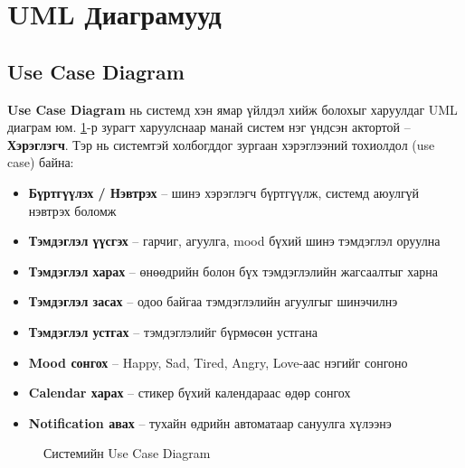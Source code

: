\section{UML Диаграмууд}

\subsection{Use Case Diagram}

\textbf{Use Case Diagram} нь системд хэн ямар үйлдэл хийж болохыг харуулдаг UML диаграм юм.
\ref{fig:usecase}-р зурагт харуулснаар манай систем нэг үндсэн актортой -- \textbf{Хэрэглэгч}.
Тэр нь системтэй холбогддог зургаан хэрэглээний тохиолдол (use case) байна:

\begin{itemize}
  \item \textbf{Бүртгүүлэх / Нэвтрэх} -- шинэ хэрэглэгч бүртгүүлж, системд аюулгүй нэвтрэх боломж
  \item \textbf{Тэмдэглэл үүсгэх} -- гарчиг, агуулга, mood бүхий шинэ тэмдэглэл оруулна
  \item \textbf{Тэмдэглэл харах} -- өнөөдрийн болон бүх тэмдэглэлийн жагсаалтыг харна
  \item \textbf{Тэмдэглэл засах} -- одоо байгаа тэмдэглэлийн агуулгыг шинэчилнэ
  \item \textbf{Тэмдэглэл устгах} -- тэмдэглэлийг бүрмөсөн устгана
  \item \textbf{Mood сонгох} -- Happy, Sad, Tired, Angry, Love-аас нэгийг сонгоно  \item \textbf{Calendar харах} -- стикер бүхий календараас өдөр сонгох
  \item \textbf{Notification авах} -- тухайн өдрийн автоматаар сануулга хүлээнэ\end{itemize}

\begin{figure}[ht]
\centering
{}
\caption{Системийн Use Case Diagram}
\label{fig:usecase}
\end{figure}

